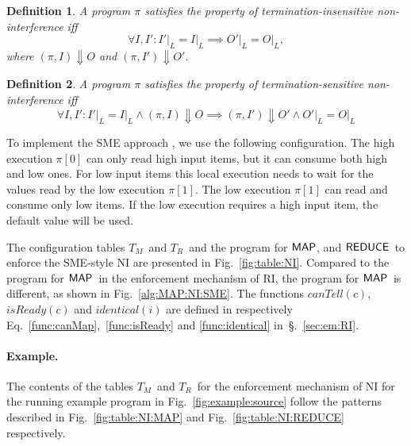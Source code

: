 \documentclass[10pt,a4paper,oneside]{article}
\newtheorem{definition}{Definition}[section]
\def\execution#1#2#3{\ensuremath{(#1, #2)\Downarrow#3}}
\def\loweq#1#2{\ensuremath{\restrict{#1}{L} = \restrict{#2}{L}}}
\def\restrict#1#2{\ensuremath{{#1}|_{#2}}}
\def\TAV{\ensuremath{T_{M}}}
\def\TPV{\ensuremath{T_{R}}}
\def\chnl{\ensuremath{c}}
\def\sanserif#1{\ensuremath{\sf #1}}
\def\REDUCE{\ensuremath{\sanserif{REDUCE}}}
\def\MAP{\ensuremath{\sanserif{MAP}}}
\def\Prog{\ensuremath{\pi}}
\def\Progl#1{\ensuremath{\Prog[#1]}}
\def\NCMAP{\ensuremath{canTell}}
\def\NISREADY{\ensuremath{isReady}}
\def\canMap#1{\ensuremath{\NCMAP(#1)}}
\def\isReady#1{\ensuremath{\NISREADY(#1)}}
\def\identical#1{\ensuremath{identical(#1)}}
\begin{document}
\begin{definition}\label{def:NI}
A program $\Prog$ satisfies the property of \emph{termination-insensitive non-interference} iff
\begin{equation*}
\forall I, I': \loweq{I'}{I} \implies \loweq{O'}{O},
\end{equation*}
where \execution{\Prog}{I}{O} and \execution{\Prog}{I'}{O'}.
\end{definition}


\begin{definition}\label{def:TSNI}
A program $\Prog$ satisfies the property of \emph{termination-sensitive non-interference} iff
\begin{equation*}
 \forall I, I': \loweq{I'}{I} \wedge \execution{\Prog}{I}{O} \implies \execution{\Prog}{I'}{O'} \wedge \loweq{O'}{O}
\end{equation*}
\end{definition}


To implement the SME approach \cite{Devr-Pies-10-IEEESP}, we use the following configuration. The high execution $\Progl{0}$ can only read high input items, but it can consume both high and low ones. For low input items this local execution needs to wait for the values read by the low execution \Progl{1}. The low execution $\Progl{1}$ can read and consume only low items. If the low execution requires a high input item, the default value will be used.



The configuration tables \TAV\ and \TPV\ and the program for \MAP, and \REDUCE\ to enforce the SME-style NI are presented in Fig.~\ref{fig:table:NI}. Compared to the program for \MAP\ in the enforcement mechanism of RI, the program for \MAP\ is different, as shown in Fig.~\ref{alg:MAP:NI:SME}. The functions $\canMap{\chnl}$, $\isReady{\chnl}$ and $\identical{i}$ are defined in respectively Eq.~\ref{func:canMap},~\ref{func:isReady} and \ref{func:identical} in~\S.~\ref{sec:em:RI}.

\paragraph{Example.}
The contents of the tables \TAV\ and \TPV\ for the enforcement mechanism of NI for the running example program in Fig.~\ref{fig:example:source} follow the patterns described in Fig.~\ref{fig:table:NI:MAP} and Fig.~\ref{fig:table:NI:REDUCE} respectively. 
\end{document}
